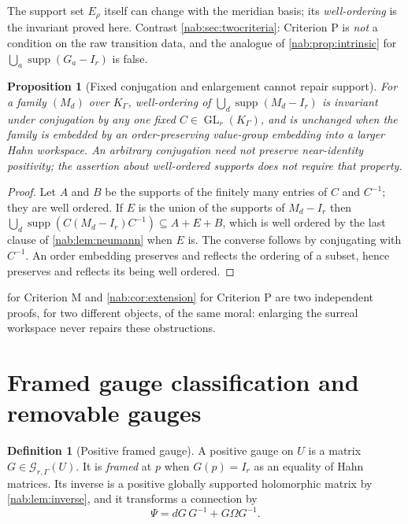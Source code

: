 \documentclass[11pt,letterpaper]{article}
\newtheorem{proposition}[proposition]{Proposition}
\theoremstyle{definition}
\newtheorem{definition}[definition]{Definition}
\theoremstyle{remark}
\newcommand{\GG}{\mathscr G_{r,\Gamma}}
\newcommand{\K}{K_\Gamma}
\newcommand{\GL}{\operatorname{GL}}
\newcommand{\supp}{\operatorname{supp}}
\numberwithin{equation}{section}
\begin{document}
The support set $E_\rho$ itself can change with the meridian basis; its
\emph{well-ordering} is the invariant proved here. Contrast
\cref{nab:sec:twocriteria}: Criterion P is \emph{not} a
condition on the raw transition data, and the analogue of
\cref{nab:prop:intrinsic} for $\bigcup_a\supp(G_a-I_r)$ is false.

\begin{proposition}[Fixed conjugation and enlargement cannot repair support]
\label{nab:prop:conjugation}
For a family $(M_d)$ over $\K$, well-ordering of
$\bigcup_d\supp(M_d-I_r)$ is invariant under conjugation by any one fixed
$C\in\GL_r(\K)$, and is unchanged when the family is embedded by an
order-preserving value-group embedding into a larger Hahn workspace. An
arbitrary conjugation need not preserve near-identity positivity; the assertion
about well-ordered supports does not require that property.
\end{proposition}

\begin{proof}
Let $A$ and $B$ be the supports of the finitely many entries of $C$ and
$C^{-1}$; they are well ordered. If $E$ is the union of the supports of
$M_d-I_r$ then
$\bigcup_d\supp(C(M_d-I_r)C^{-1})\subseteq A+E+B$, which is well ordered by
the last clause of \cref{nab:lem:neumann} when $E$ is. The converse follows by
conjugating with $C^{-1}$. An order embedding preserves and reflects the
ordering of a subset, hence preserves and reflects its being well ordered.
\end{proof}

 for Criterion M and \cref{nab:cor:extension} for
Criterion P are two independent proofs, for two different objects, of the same
moral: enlarging the surreal workspace never repairs these obstructions.

\section{Framed gauge classification and removable gauges}
\label{nab:sec:gauge}

\begin{definition}[Positive framed gauge]\label{nab:def:gauge}
A positive gauge on $U$ is a matrix $G\in\GG(U)$. It is \emph{framed} at $p$
when $G(p)=I_r$ as an equality of Hahn matrices. Its inverse is a positive
globally supported holomorphic matrix by \cref{nab:lem:inverse}, and it
transforms a connection by
\begin{equation}\label{nab:eq:gaugeact}
 \Psi=dG\,G^{-1}+G\Omega G^{-1}.
\end{equation}
\end{definition}
\end{document}
